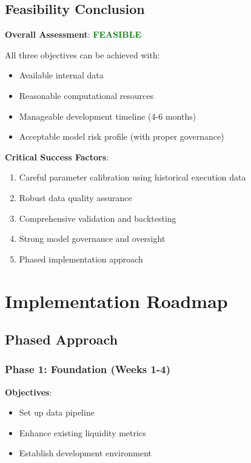 \documentclass[11pt,a4paper]{article}
\begin{document}
\subsection{Feasibility Conclusion}

\textbf{Overall Assessment}: \textcolor{green}{\textbf{FEASIBLE}}

All three objectives can be achieved with:
\begin{itemize}
    \item[\checkmark] Available internal data
    \item[\checkmark] Reasonable computational resources
    \item[\checkmark] Manageable development timeline (4-6 months)
    \item[\checkmark] Acceptable model risk profile (with proper governance)
\end{itemize}

\textbf{Critical Success Factors}:
\begin{enumerate}
    \item Careful parameter calibration using historical execution data
    \item Robust data quality assurance
    \item Comprehensive validation and backtesting
    \item Strong model governance and oversight
    \item Phased implementation approach
\end{enumerate}

\section{Implementation Roadmap}

\subsection{Phased Approach}

\subsubsection{Phase 1: Foundation (Weeks 1-4)}

\textbf{Objectives}:
\begin{itemize}
    \item Set up data pipeline
    \item Enhance existing liquidity metrics
    \item Establish development environment
\end{itemize}
\end{document}
